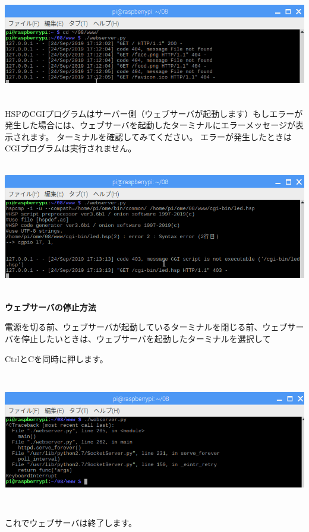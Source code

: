 \documentclass[a4paper,12pt,dvipdfmx]{jarticle}
\begin{document}
\begin{center}
\includegraphics[width=17.006cm,height=4.71cm]{textbook-img064.png}

\end{center}
HSPのCGIプログラムはサーバー側（ウェブサーバが起動します）もしエラーが発生した場合には、ウェブサーバを起動したターミナルにエラーメッセージが表示されます。
ターミナルを確認してみてください。
エラーが発生したときはCGIプログラムは実行されません。

\begin{center}
\includegraphics[width=17.006cm,height=5.696cm]{textbook-img065.png}

\end{center}
{\bfseries
ウェブサーバの停止方法}

電源を切る前、ウェブサーバが起動しているターミナルを閉じる前、ウェブサーバを停止したいときは、ウェブサーバを起動したターミナルを選択して

CtrlとCを同時に押します。



\begin{center}
\includegraphics[width=17.006cm,height=5.935cm]{textbook-img066.png}

\end{center}
これでウェブサーバは終了します。
\end{document}

